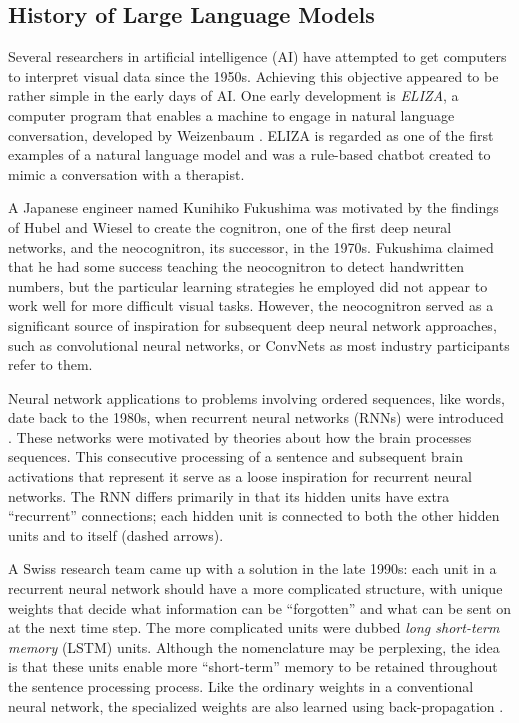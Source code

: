 \subsection{History of Large Language Models}
Several researchers in artificial intelligence (AI) have attempted to get computers to interpret visual data since the 1950s. Achieving this objective appeared to be rather simple in the early days of AI. One early development is \textit{ELIZA}, a computer program that enables a machine to engage in natural language conversation, developed by Weizenbaum \cite{weizenbaum1966}. ELIZA is regarded as one of the first examples of a natural language model and was a rule-based chatbot created to mimic a conversation with a therapist.

A Japanese engineer named Kunihiko Fukushima was motivated by the findings of Hubel and Wiesel \cite{hubel1959} to create the cognitron, one of the first deep neural networks, and the neocognitron, its successor, in the 1970s. Fukushima \cite{fukushima1969} claimed that he had some success teaching the neocognitron to detect handwritten numbers, but the particular learning strategies he employed did not appear to work well for more difficult visual tasks. However, the neocognitron served as a significant source of inspiration for subsequent deep neural network approaches, such as convolutional neural networks, or ConvNets as most industry participants refer to them.

Neural network applications to problems involving ordered sequences, like words, date back to the 1980s, when recurrent neural networks (RNNs) were introduced \cite{elman1990}. These networks were motivated by theories about how the brain processes sequences. This consecutive processing of a sentence and subsequent brain activations that represent it serve as a loose inspiration for recurrent neural networks. The RNN differs primarily in that its hidden units have extra ``recurrent'' connections; each hidden unit is connected to both the other hidden units and to itself (dashed arrows).

A Swiss research team came up with a solution in the late 1990s: each unit in a recurrent neural network should have a more complicated structure, with unique weights that decide what information can be ``forgotten'' and what can be sent on at the next time step. The more complicated units were dubbed \textit{long short-term memory} (LSTM) units. Although the nomenclature may be perplexing, the idea is that these units enable more ``short-term'' memory to be retained throughout the sentence processing process. Like the ordinary weights in a conventional neural network, the specialized weights are also learned using back-propagation \cite{gers2000}.

